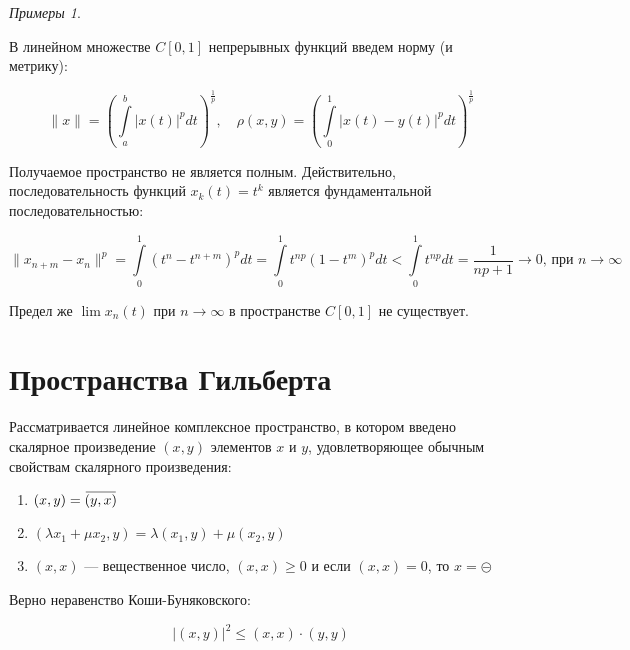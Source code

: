 \documentclass[12pt,a4paper,titlepage,oneside]{book}
\newcommand{\overbar}[1]{\mkern 1.5mu\overline{\mkern-1.5mu#1\mkern-1.5mu}\mkern 1.5mu}
\theoremstyle{definition}
\theoremstyle{plain}
\theoremstyle{remark}
\theoremstyle{remark}
\theoremstyle{remark}
\newtheorem*{examples}{Примеры}
\theoremstyle{remark}
\theoremstyle{plain}
\theoremstyle{plain}
\begin{document}
\begin{examples}
\begin{enumerate}
	В линейном множестве $C[0,1]$ непрерывных функций введем норму (и метрику):

	\begin{equation*}
	\lVert x\rVert = (\int\limits_a^b\lvert x(t)\rvert^pdt)^{\frac{1}{p}},\quad\rho(x,y) = (\int\limits_0^1\lvert x(t)-y(t)\rvert^pdt)^{\frac{1}{p}}
	\end{equation*}

	Получаемое пространство не является полным. Действительно, последовательность функций $x_k(t)=t^k$ является фундаментальной последовательностью:

	\begin{equation*}
	\lVert x_{n+m}-x_n\rVert^p=\int\limits_0^1(t^n-t^{n+m})^pdt=\int\limits_0^1t^{np}(1-t^m)^pdt<\int\limits_0^1t^{np}dt=\frac{1}{np+1}\to0 \mbox{, при } n \to\infty
	\end{equation*}

	Предел же $\lim x_n(t)$ при $n\to\infty$ в пространстве $C[0,1]$ не существует.

\end{enumerate}

\end{examples}

\section{Пространства Гильберта}

Рассматривается линейное комплексное пространство, в котором введено скалярное произведение $(x, y)$ элементов $x$ и $y$, удовлетворяющее обычным свойствам скалярного произведения:

\begin{enumerate}

    \item $(x, y) = \overbar{(y, x)}$

    \item $(\lambda x_1 + \mu x_2, y) = \lambda (x_1, y) + \mu (x_2, y)$

    \item $(x, x)$ --- вещественное число, $(x, x) \geqslant 0$ и если $(x, x) = 0$, то $x = \circleddash$

\end{enumerate}

Верно неравенство Коши-Буняковского:

\begin{equation*}
\lvert (x, y) \rvert ^2 \leqslant (x, x) \cdot (y, y)
\end{equation*}
\end{document}
